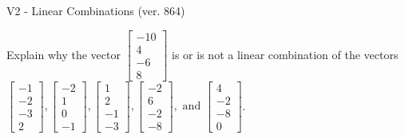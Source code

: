 \begin{exercise}
  \begin{exerciseTitle}V2 - Linear Combinations (ver. 864)\end{exerciseTitle}
  \begin{exerciseStatement}
    Explain why the vector \(\left[\begin{array}{c}
-10 \\
4 \\
-6 \\
8
\end{array}\right]\)  is or is not a linear 
	combination of the vectors \(\left[\begin{array}{c}
-1 \\
-2 \\
-3 \\
2
\end{array}\right] , \left[\begin{array}{c}
-2 \\
1 \\
0 \\
-1
\end{array}\right] , \left[\begin{array}{c}
1 \\
2 \\
-1 \\
-3
\end{array}\right] , \left[\begin{array}{c}
-2 \\
6 \\
-2 \\
-8
\end{array}\right] , \text{ and } \left[\begin{array}{c}
4 \\
-2 \\
-8 \\
0
\end{array}\right]\).
	



\end{exerciseStatement}
\end{exercise}
